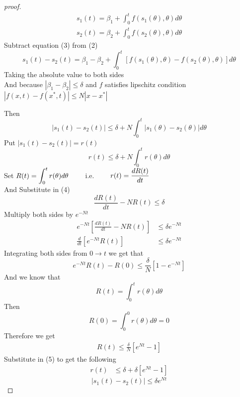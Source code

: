 \documentclass[]{article}
\begin{document}
\begin{proof}[proof]
    \begin{align}
        s_1(t) = \beta_1 + \int_{0}^{t}f(s_1(\theta),\theta)d\theta
        \\
        s_2(t) = \beta_2 + \int_{0}^{t}f(s_2(\theta),\theta)d\theta
    \end{align}
    Subtract equation (3) from (2)
    \[
        s_1(t) - s_2(t) = \beta_1 - \beta_2 + \int_{0}^{t} \left[ f(s_1(\theta),\theta) - f(s_2(\theta),\theta)\right]d\theta
    \]
    Taking the absolute value to both sides
    \\
    And because $\left\lvert \beta_1 - \beta_2 \right\rvert \leq \delta $
    and $f$ satisfies lipschitz condition $\left\lvert f(x,t) - f(x^*,t)\right\rvert \leq N\left\lvert x - x^*\right\rvert$
    \par
    Then
    \[
        |s_1(t) - s_2(t)| \leq \delta  + N \int_{0}^{t} \left\lvert s_1(\theta) - s_2(\theta) \right\rvert d\theta
    \]
    Put $|s_1(t) - s_2(t)| = r(t)$
    \begin{equation}
        r(t) \leq \delta  + N \int_{0}^{t} r(\theta) d\theta
    \end{equation}
    Set $\displaystyle R(t) = \int_{0}^{t} r(\theta)d\theta \quad\quad$ i.e. $\quad\quad \displaystyle r(t) = \frac{dR(t)}{dt} $
    \\
    And Substitute in (4)
    \begin{equation}
        \frac{dR(t)}{dt} - NR(t) \leq \delta
    \end{equation}
    Multiply both sides by $e^{-Nt}$
    \begin{align*}
        e^{-Nt}\left[\frac{dR(t)}{dt} - NR(t)\right] & \leq \delta e^{-Nt}
        \\
        \frac{d}{dt}\left[e^{-Nt}R(t)\right]         & \leq \delta e^{-Nt}
    \end{align*}
    Integrating both sides from $0 \to t$ we get that
    \[
        e^{-Nt}R(t) - R(0) \leq \frac{\delta}{N}\left[1-e^{-Nt}\right]
    \]
    And we know that
    \[
        R(t) = \int_{0}^{t} r(\theta)d\theta
    \]
    Then
    \[
        R(0) = \int_{0}^{0} r(\theta)d\theta = 0
    \]
    Therefore we get
    \begin{align*}
        R(t) \leq \frac{\delta}{N}\left[e^{Nt}-1\right]
    \end{align*}
    Substitute in (5) to get the following
    \begin{align*}
        r(t) & \leq \delta + \delta\left[e^{Nt}-1\right]
    \end{align*}
    \begin{equation*}
        |s_1(t) - s_2(t)| \leq \delta e^{Nt}
    \end{equation*}
\end{proof}
\end{document}

